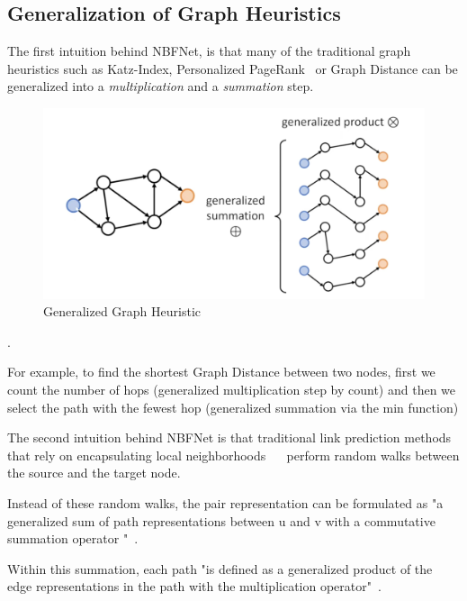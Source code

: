 \subsection{Generalization of Graph Heuristics}\label{subsec:generalization-of-graph-heuristics}

The first intuition behind NBFNet, is that many of the traditional graph heuristics such as Katz-Index, Personalized PageRank~\cite{Page1998PageRank}
or Graph Distance can be generalized into a \textit{multiplication} and a \textit{summation} step.

\begin{figure}[h] %
    \centering %
    \includegraphics[width=0.8\linewidth]{figures/nbfnet-trad} %
    \caption{Generalized Graph Heuristic ~\cite{NBfnetPres}} %
    \label{fig:nbfnet-trad} %
\end{figure}.

For example, to find the shortest Graph Distance between two nodes, first we count the number of hops (generalized multiplication step by count) and then we select
the path with the fewest hop (generalized summation via the min function)

The second intuition behind NBFNet is that traditional link prediction methods that rely on encapsulating local neighborhoods~ ~\cite{RandomWalks,SubgraphExtraction}
perform random walks between the source and the target node.

Instead of these random walks, the pair representation can be formulated as "a generalized sum of path representations between u and v with a commutative
summation operator \bigoplus"~\cite{NBFNet}.

Within this summation, each path "is defined as a generalized product of the edge
representations in the path with the multiplication operator"~\cite{NBFNet}.

